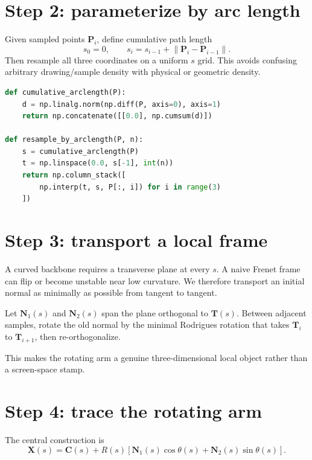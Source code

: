\documentclass[aps,preprint,onecolumn,nofootinbib]{revtex4-2}
\begin{document}
\section{Step 2: parameterize by arc length}

Given sampled points $\mathbf P_i$, define cumulative path length
\begin{equation}
s_0=0,\qquad s_i=s_{i-1}+\lVert \mathbf P_i-\mathbf P_{i-1}\rVert .
\end{equation}
Then resample all three coordinates on a uniform $s$ grid. This avoids confusing arbitrary drawing/sample density with physical or geometric density.

\begin{lstlisting}[language=Python,caption={Arc-length resampling.}]
def cumulative_arclength(P):
    d = np.linalg.norm(np.diff(P, axis=0), axis=1)
    return np.concatenate([[0.0], np.cumsum(d)])

def resample_by_arclength(P, n):
    s = cumulative_arclength(P)
    t = np.linspace(0.0, s[-1], int(n))
    return np.column_stack([
        np.interp(t, s, P[:, i]) for i in range(3)
    ])
\end{lstlisting}

\section{Step 3: transport a local frame}

A curved backbone requires a transverse plane at every $s$. A naive Frenet frame can flip or become unstable near low curvature. We therefore transport an initial normal as minimally as possible from tangent to tangent.

Let $\mathbf N_1(s)$ and $\mathbf N_2(s)$ span the plane orthogonal to $\mathbf T(s)$. Between adjacent samples, rotate the old normal by the minimal Rodrigues rotation that takes $\mathbf T_i$ to $\mathbf T_{i+1}$, then re-orthogonalize.

This makes the rotating arm a genuine three-dimensional local object rather than a screen-space stamp.

\section{Step 4: trace the rotating arm}

The central construction is
\begin{equation}
\mathbf X(s)=\mathbf C(s)+R(s)\left[\mathbf N_1(s)\cos\theta(s)+\mathbf N_2(s)\sin\theta(s)\right].
\label{eq:wrap}
\end{equation}
\end{document}
